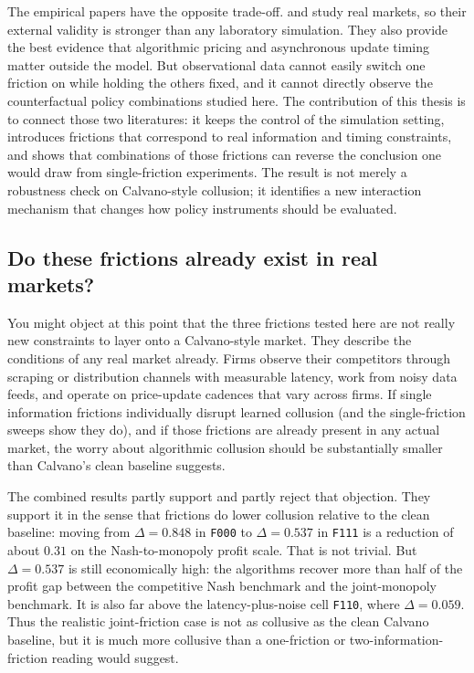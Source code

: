 The empirical papers have the opposite trade-off. \citet{assad2024} and \citet{brown2023} study real markets, so their external validity is stronger than any laboratory simulation. They also provide the best evidence that algorithmic pricing and asynchronous update timing matter outside the model. But observational data cannot easily switch one friction on while holding the others fixed, and it cannot directly observe the counterfactual policy combinations studied here. The contribution of this thesis is to connect those two literatures: it keeps the control of the simulation setting, introduces frictions that correspond to real information and timing constraints, and shows that combinations of those frictions can reverse the conclusion one would draw from single-friction experiments. The result is not merely a robustness check on Calvano-style collusion; it identifies a new interaction mechanism that changes how policy instruments should be evaluated.

\subsection{Do these frictions already exist in real markets?}
\label{sec:discussion-existing-frictions}

You might object at this point that the three frictions tested here are not really new constraints to layer onto a Calvano-style market. They describe the conditions of any real market already. Firms observe their competitors through scraping or distribution channels with measurable latency, work from noisy data feeds, and operate on price-update cadences that vary across firms. If single information frictions individually disrupt learned collusion (and the single-friction sweeps show they do), and if those frictions are already present in any actual market, the worry about algorithmic collusion should be substantially smaller than Calvano's clean baseline suggests.

The combined results partly support and partly reject that objection. They support it in the sense that frictions do lower collusion relative to the clean baseline: moving from $\Delta=0.848$ in \texttt{F000} to $\Delta=0.537$ in \texttt{F111} is a reduction of about $0.31$ on the Nash-to-monopoly profit scale. That is not trivial. But $\Delta=0.537$ is still economically high: the algorithms recover more than half of the profit gap between the competitive Nash benchmark and the joint-monopoly benchmark. It is also far above the latency-plus-noise cell \texttt{F110}, where $\Delta=0.059$. Thus the realistic joint-friction case is not as collusive as the clean Calvano baseline, but it is much more collusive than a one-friction or two-information-friction reading would suggest.

